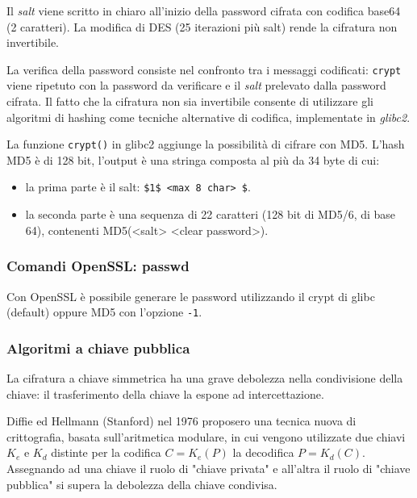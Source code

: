             Il \textit{salt} viene scritto in chiaro all'inizio della password cifrata con codifica base64 (2 caratteri). La modifica di DES (25 iterazioni più salt) rende la cifratura non invertibile.

            La verifica della password consiste nel confronto tra i messaggi codificati: \verb|crypt| viene ripetuto con la password da verificare e il \textit{salt} prelevato dalla password cifrata. Il fatto che la cifratura non sia invertibile consente di utilizzare gli algoritmi di hashing come tecniche alternative di codifica, implementate in \textit{glibc2}.

            La funzione \verb|crypt()| in glibc2 aggiunge la possibilità di cifrare con MD5. L'hash MD5 è di 128 bit, l'output è una stringa composta al più da 34 byte di cui:
            \begin{itemize}
                \item la prima parte è il salt: \verb|$1$ <max 8 char> $|.
                \item la seconda parte è una sequenza di 22 caratteri (128 bit di MD5/6, di base 64), contenenti MD5(<salt> <clear password>).
            \end{itemize}

        \subsubsection{Comandi OpenSSL: passwd}
            Con OpenSSL è possibile generare le password utilizzando il crypt di glibc (default) oppure MD5 con l'opzione \verb|-1|.

            

        \subsubsection{Algoritmi a chiave pubblica}
            La cifratura a chiave simmetrica ha una grave debolezza nella condivisione della chiave: il trasferimento della chiave la espone ad intercettazione.
        
            Diffie ed Hellmann (Stanford) nel 1976 proposero una tecnica nuova di crittografia, basata sull'aritmetica modulare, in cui vengono utilizzate due chiavi $K_e$ e $K_d$ distinte per la codifica $C = K_e(P)$ la decodifica $P = K_d(C)$. Assegnando ad una chiave il ruolo di "chiave privata" e all'altra il ruolo di "chiave pubblica" si supera la debolezza della chiave condivisa.

